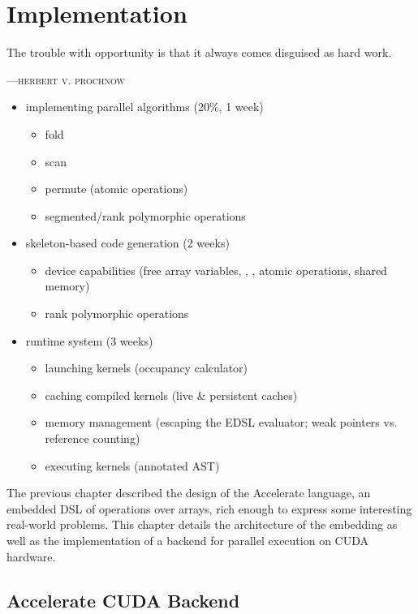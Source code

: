 
\chapter{Implementation}
\epigraph{The trouble with opportunity is that it always comes disguised as hard work.}%
{\textsc{---herbert v. prochnow}}


\begin{itemize}
\item implementing parallel algorithms (20\%, 1 week)
    \begin{itemize}
        \item fold
        \item scan
        \item permute (atomic operations)
        \item segmented/rank polymorphic operations
    \end{itemize}

\item skeleton-based code generation (2 weeks)
    \begin{itemize}
        \item device capabilities (free array variables, ,
            , atomic operations, shared memory)
        \item rank polymorphic operations
    \end{itemize}

\item runtime system (3 weeks)
    \begin{itemize}
        \item launching kernels (occupancy calculator)
        \item caching compiled kernels (live \& persistent caches)
        \item memory management (escaping the EDSL evaluator; weak pointers vs.
            reference counting)
        \item executing kernels (annotated AST)
    \end{itemize}

\end{itemize}


The previous chapter described the design of the Accelerate language, an
embedded DSL of operations over arrays, rich enough to express some interesting
real-world problems. This chapter details the architecture of the embedding as
well as the implementation of a backend for parallel execution on CUDA hardware.

\section{Accelerate CUDA Backend}
